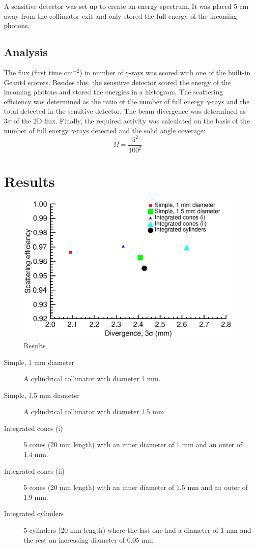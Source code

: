 \documentclass[a4paper]{article}
\begin{document}
A sensitive detector was set up to create an energy spectrum. It was placed 5 cm away from the collimator exit and only stored the full energy of the incoming photons.

\subsection{Analysis}
The flux (first time cm$^{-2}$) in number of $\gamma$-rays was scored with one of the built-in Geant4 scorers. Besides this, the sensitive detector scored the energy of the incoming photons and stored the energies in a histogram.
The scattering efficiency was determined as the ratio of the number of full energy $\gamma$-rays and the total detected in the sensitive detector. The beam divergence was determined as $3\sigma$ of the 2D flux. Finally, the required activity was calculated on the basis of the number of full energy $\gamma$-rays detected and the solid angle coverage:
\begin{equation}
  \Omega = \frac{5^2}{100^2}
  \label{eq:solid_angle}
\end{equation}

\section{Results}
\begin{figure}[H]
  \centering
  \includegraphics[width=\textwidth]{efficiency.eps}
  \caption{Results}
  \label{fig:EffvsDiv}
\end{figure}
\begin{description}
  \item[Simple, 1 mm diameter] A cylindrical collimator with diameter 1 mm.
  \item[Simple, 1.5 mm diameter] A cylindrical collimator with diameter 1.5 mm.
  \item[Integrated cones (i)] 5 cones (20 mm length) with an inner diameter of 1 mm and an outer of 1.4 mm.
  \item[Integrated cones (ii)] 5 cones (20 mm length) with an inner diameter of 1.5 mm and an outer of 1.9 mm.
  \item[Integrated cylinders] 5 cylinders (20 mm length) where the last one had a diameter of 1 mm and the rest an increasing diameter of 0.05 mm.
\end{description}
\end{document}
